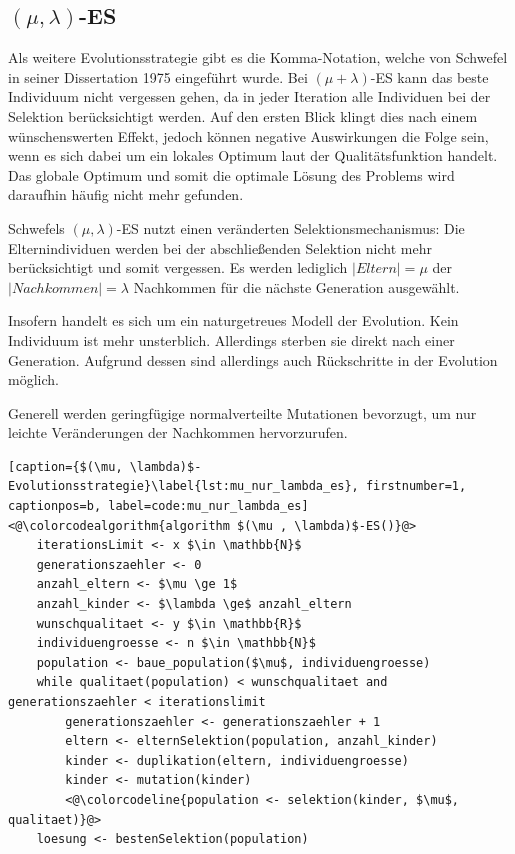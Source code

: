 \subsection{$(\mu, \lambda)$-ES}

Als weitere Evolutionsstrategie gibt es die Komma-Notation, welche von Schwefel in seiner Dissertation 1975 eingeführt wurde. Bei $(\mu + \lambda)$-ES kann das beste Individuum nicht vergessen gehen, da in jeder Iteration alle Individuen bei der Selektion berücksichtigt werden. Auf den ersten Blick klingt dies nach einem wünschenswerten Effekt, jedoch können negative Auswirkungen die Folge sein, wenn es sich dabei um ein lokales Optimum laut der Qualitätsfunktion handelt.
Das globale Optimum und somit die optimale Lösung des Problems wird daraufhin häufig nicht mehr gefunden.

Schwefels $(\mu, \lambda)$-ES nutzt einen veränderten Selektionsmechanismus:
Die Elternindividuen werden bei der abschließenden Selektion nicht mehr berücksichtigt und somit vergessen. Es werden lediglich $|Eltern| = \mu$ der $|Nachkommen| = \lambda$ Nachkommen für die nächste Generation ausgewählt.

Insofern handelt es sich um ein naturgetreues Modell der Evolution. Kein Individuum ist mehr unsterblich. Allerdings sterben sie direkt nach einer Generation. Aufgrund dessen sind allerdings auch Rückschritte in der Evolution möglich.

Generell werden geringfügige normalverteilte Mutationen bevorzugt, um nur leichte Veränderungen der Nachkommen hervorzurufen.

\begin{lstlisting}[caption={$(\mu, \lambda)$-Evolutionsstrategie}\label{lst:mu_nur_lambda_es}, firstnumber=1, captionpos=b, label=code:mu_nur_lambda_es]
<@\colorcodealgorithm{algorithm $(\mu , \lambda)$-ES()}@>
	iterationsLimit <- x $\in \mathbb{N}$
	generationszaehler <- 0
	anzahl_eltern <- $\mu \ge 1$
	anzahl_kinder <- $\lambda \ge$ anzahl_eltern
	wunschqualitaet <- y $\in \mathbb{R}$
	individuengroesse <- n $\in \mathbb{N}$
	population <- baue_population($\mu$, individuengroesse)
	while qualitaet(population) < wunschqualitaet and generationszaehler < iterationslimit
		generationszaehler <- generationszaehler + 1
		eltern <- elternSelektion(population, anzahl_kinder)
		kinder <- duplikation(eltern, individuengroesse)
		kinder <- mutation(kinder)
		<@\colorcodeline{population <- selektion(kinder, $\mu$, qualitaet)}@>
	loesung <- bestenSelektion(population)
\end{lstlisting}

